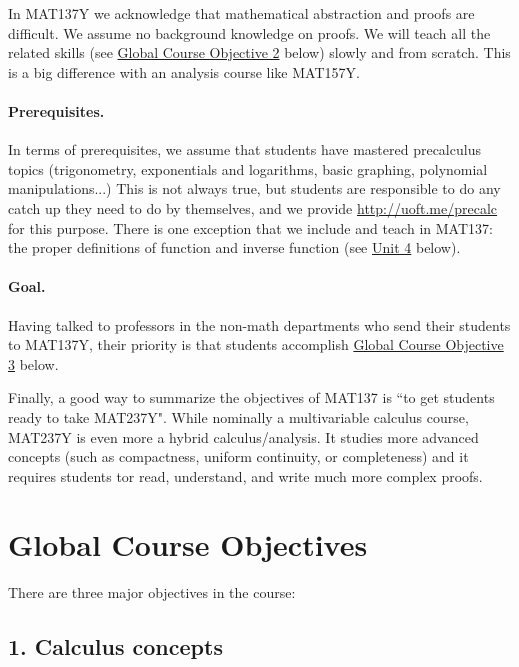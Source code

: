 \documentclass[11pt]{article}
\begin{document}
{\baselineskip

In MAT137Y we acknowledge that mathematical abstraction and proofs are difficult.  We assume no background knowledge on proofs.  We will teach all the related skills (see \hyperref[CO2]{Global Course Objective 2} below) slowly and from scratch.  This is a big difference with an analysis course like MAT157Y.}

\paragraph{Prerequisites.} In terms of prerequisites, we assume that students have mastered precalculus topics (trigonometry, exponentials and logarithms, basic graphing, polynomial manipulations...)  This is not always true, but students are responsible to do any catch up they need to do by themselves, and we provide \href{http://uoft.me/precalc}{http://uoft.me/precalc} for this purpose.  There is one exception that we include and teach in MAT137: the proper definitions of function and inverse function (see \hyperref[unit4]{Unit 4} below).

\paragraph{Goal.} Having talked to professors in the non-math departments who send their students to MAT137Y, their priority is that students accomplish \hyperref[CO3]{Global Course Objective 3} below.

{\baselineskip
Finally, a good way to summarize the objectives of MAT137 is ``to get students ready to take MAT237Y".  While nominally a multivariable calculus course, MAT237Y is even more a hybrid calculus/analysis.  It studies more advanced concepts (such as compactness, uniform continuity, or completeness) and it requires students tor read, understand, and write much more complex proofs.  
}
\newpage


\section{Global Course Objectives}\label{GCO}


There are three major objectives in the course:

\subsection{1. Calculus concepts} \label{CO1}
\end{document}
